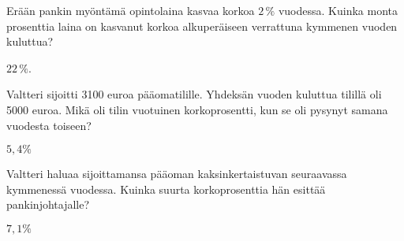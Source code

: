 \begin{tehtavasivu}
\begin{tehtava}
\begin{alakohdat}
\end{alakohdat}
\begin{vastaus}
\begin{alakohdat}
\end{alakohdat}
\end{vastaus}
\end{tehtava}

\begin{tehtava}
\begin{alakohdat}
\end{alakohdat}
\begin{vastaus}
\begin{alakohdat}
\end{alakohdat}
\end{vastaus}
\end{tehtava}

\begin{tehtava}
    Erään pankin myöntämä opintolaina kasvaa korkoa $2\,\%$ vuodessa. Kuinka monta 
    prosenttia laina on kasvanut korkoa alkuperäiseen verrattuna kymmenen vuoden kuluttua?
    \begin{vastaus}
        $22\,\%$.
    \end{vastaus}
\end{tehtava}

\begin{tehtava}%
Valtteri sijoitti 3100 euroa pääomatilille. Yhdeksän vuoden kuluttua tilillä oli 5000 euroa. Mikä oli tilin vuotuinen korkoprosentti, kun se oli pysynyt samana vuodesta toiseen? 
\begin{vastaus}
$5,4\%$
\end{vastaus}
\end{tehtava}
\begin{tehtava}%
Valtteri haluaa sijoittamansa pääoman kaksinkertaistuvan seuraavassa kymmenessä vuodessa. Kuinka suurta korkoprosenttia hän esittää pankinjohtajalle?
\begin{vastaus}
$7,1\%$
\end{vastaus}
\end{tehtava}


\end{tehtavasivu}
